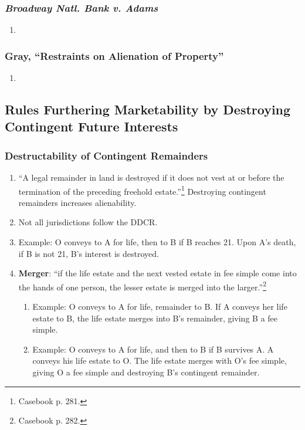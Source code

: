 \subsubsection{\emph{Broadway Natl. Bank v. Adams}}

\begin{enumerate}
    \item %
\end{enumerate}

\subsubsection{Gray, ``Restraints on Alienation of Property''}

\begin{enumerate}
    \item %
\end{enumerate}

\subsection{Rules Furthering Marketability by Destroying Contingent Future 
Interests}

\subsubsection{Destructability of Contingent Remainders}

\begin{enumerate}
    \item ``A legal remainder in land is destroyed if it does not vest at or 
    before the termination of the preceding freehold 
    estate.''\footnote{Casebook p. 281.} Destroying contingent remainders 
    increases alienability.
    \item Not all jurisdictions follow the DDCR.
    \item Example: O conveys to A for life, then to B if B reaches 21. Upon 
    A's death, if B is not 21, B's interest is destroyed.
    \item \textbf{Merger}: ``if the life estate and the next vested estate in 
    fee simple come into the hands of one person, the lesser estate is merged 
    into the larger.''\footnote{Casebook p. 282.}
    \begin{enumerate}
        \item Example: O conveys to A for life, remainder to B. If A conveys 
        her life estate to B, the life estate merges into B's remainder, 
        giving B a fee simple.
        \item Example: O conveys to A for life, and then to B if B survives A. 
        A conveys his life estate to O. The life estate merges with O's fee 
        simple, giving O a fee simple and destroying B's contingent remainder.
    \end{enumerate}
\end{enumerate}

